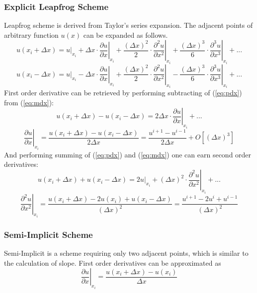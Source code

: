 \subsubsection{Explicit Leapfrog Scheme}
Leapfrog scheme is derived from Taylor's series expansion. The adjacent points of arbitrary function $u(x)$ can be
expanded as follows.
\begin{equation}\label{eq:pdx}
  u(x_i+\Delta x) = u|_{x_i} + 
  \Delta x\cdot\left.\frac{\partial u}{\partial x}\right|_{x_i} + 
  \frac{(\Delta x)^2}{2}\cdot\left.\frac{\partial ^2 u}{\partial x^2}\right|_{x_i} + 
  \frac{(\Delta x)^3}{6}\cdot\left.\frac{\partial ^3 u}{\partial x^3}\right|_{x_i} + ...
\end{equation}
\begin{equation}\label{eq:mdx}
  u(x_i-\Delta x) = u|_{x_i} -
  \Delta x\cdot\left.\frac{\partial u}{\partial x}\right|_{x_i} + 
  \frac{(\Delta x)^2}{2}\cdot\left.\frac{\partial ^2 u}{\partial x^2}\right|_{x_i} -
  \frac{(\Delta x)^3}{6}\cdot\left.\frac{\partial ^3 u}{\partial x^3}\right|_{x_i} + ...
\end{equation}
First order derivative can be retrieved by performing subtracting of (\ref{eq:pdx}) from (\ref{eq:mdx}):
\begin{equation}
  u(x_i+\Delta x) - u(x_i-\Delta x) = 2\Delta x\cdot\left.\frac{\partial u}{\partial x}\right|_{x_i}+...
\end{equation}
\begin{equation}
  \left.\frac{\partial u}{\partial x}\right|_{x_i} = \frac{u(x_i+\Delta x) - u(x_i-\Delta x)}{2\Delta x} = \frac{u^{i+1} - u^{i-1}}{2\Delta x} + O[(\Delta x)^3]
\end{equation}
And performing summing of (\ref{eq:pdx}) and (\ref{eq:mdx}) one can earn second order derivatives:
\begin{equation}
  u(x_i+\Delta x) + u(x_i-\Delta x) = \left.2u\right|_{x_i} + (\Delta x)^2\cdot\left.\frac{\partial ^2 u}{\partial x^2}\right|_{x_i} + ...
\end{equation}
\begin{equation}
  \left.\frac{\partial^2 u}{\partial x^2}\right|_{x_i} = \frac{u(x_i+\Delta x) - 2u(x_i) + u(x_i-\Delta x)}{(\Delta x)^2} = \frac{u^{i+1} - 2u^i + u^{i-1}}{(\Delta x)^2} %
\end{equation}


\subsubsection{Semi-Implicit Scheme}
Semi-Implicit is a scheme requiring only two adjacent points, which is similar to the calculation of slope. First order
derivatives can be approximated as
\begin{equation}
  \left.\frac{\partial u}{\partial x}\right|_{x_i} = \frac{u(x_i+\Delta x) - u(x_i)}{\Delta x}
\end{equation}





